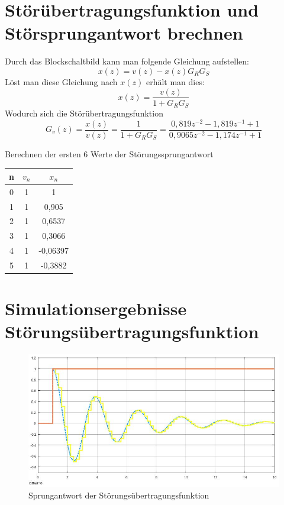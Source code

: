 \documentclass[12pt,a4paper]{article}
\begin{document}
\section{Störübertragungsfunktion und Störsprungantwort brechnen}

Durch das Blockschaltbild kann man folgende Gleichung aufstellen:
\begin{equation}
x(z)=v(z)-x(z)G_RG_S
\end{equation}
Löst man diese Gleichung nach $x(z)$ erhält man dies:
\begin{equation}
x(z)= \frac{v(z)}{1+G_RG_S}
\end{equation}
Wodurch sich die Störübertragungsfunktion
\begin{equation}
G_v(z) = \frac{x(z)}{v(z)} = \frac{1}{1+G_RG_S} = \frac{0,819z^{-2}-1,819z^{-1}+1}{0,9065z^{-2}-1,174z^{-1}+1}
\end{equation}

	Berechnen der ersten 6 Werte der Störungssprungantwort\\
		\begin{tabular}{c|c|c}
			n & $v_n$&$x_n$ \\ \hline
			0&1&1  \\ \hline
			1&1&0,905  \\ \hline
			2&1&0,6537  \\ \hline	
			3&1&0,3066  \\ \hline
			4&1&-0,06397  \\ \hline
			5&1&-0,3882  \\ 
		\end{tabular}
\newpage
\section{Simulationsergebnisse Störungsübertragungsfunktion}
	\begin{figure}[h!]
\centering
\includegraphics[width=1\linewidth]{marius/V2/Stoerungssuebertragungsfkt}
\caption{Sprungantwort der Störungsübertragungsfunktion}
\label{fig:stoerungssuebertragungsfkt}
\end{figure}
\end{document}
